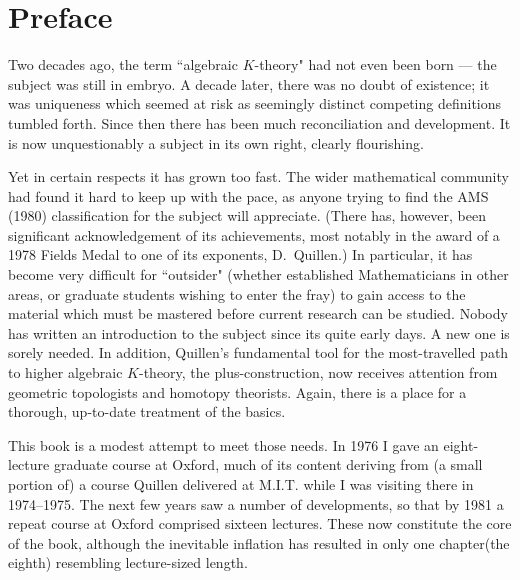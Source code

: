 \chapter*{Preface}
\label{cha:0preface}
Two decades ago, the term ``algebraic $K$-theory" had not even been born --- the subject was still in embryo. A decade later, there was no doubt of existence; it was uniqueness which seemed at risk as seemingly distinct competing definitions tumbled forth. Since then there has been much reconciliation and development. It is now unquestionably a subject in its own right, clearly flourishing.  

Yet in certain respects it has grown too fast. The wider mathematical community had found it hard to keep up with the pace, as anyone trying to find the AMS (1980) classification for the subject will appreciate. (There has, however, been significant acknowledgement of its achievements, most notably in the award of a 1978 Fields Medal to one of its exponents, D.~Quillen.) In particular,  it has become very difficult for ``outsider" (whether established Mathematicians in other areas, or graduate students wishing to enter the fray) to gain access to the material which must be mastered before current research can be studied. Nobody has written an introduction to the subject since its quite early days. A new one is sorely needed. In addition, Quillen's fundamental tool for the most-travelled path to higher algebraic $K$-theory, the plus-construction, now receives attention from geometric topologists and homotopy theorists. Again, there is a place for a thorough, up-to-date treatment of the basics. 

This book is a modest attempt to meet those needs. In 1976 I gave an eight-lecture graduate course at Oxford, much of its content deriving from (a small portion of) a course Quillen delivered at M.I.T. while I was visiting there in 1974--1975. The next few years saw a number of developments, so that by 1981 a repeat course at Oxford comprised sixteen lectures. These now constitute the core of the book, although the inevitable inflation has resulted in only one chapter(the eighth) resembling lecture-sized length. 

